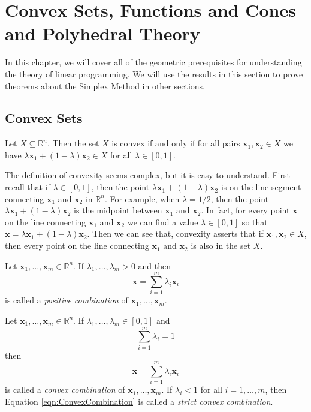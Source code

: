 \chapter{Convex Sets, Functions and Cones and Polyhedral Theory}
In this chapter, we will cover all of the geometric prerequisites for understanding the theory of linear programming. We will use the results in this section to prove theorems about the Simplex Method in other sections.

\section{Convex Sets}
\begin{definition} Let $X \subseteq \mathbb{R}^n$. Then the set $X$ is convex if and only if for all pairs $\mathbf{x}_1,\mathbf{x}_2 \in X$ we have $\lambda\mathbf{x}_1 + (1-\lambda)\mathbf{x}_2 \in X$ for all $\lambda \in [0,1]$.
\end{definition}

The definition of convexity seems complex, but it is easy to understand. First recall that if $\lambda \in [0,1]$, then the point $\lambda\mathbf{x}_1 + (1-\lambda)\mathbf{x}_2$ is on the line segment connecting $\mathbf{x}_1$ and $\mathbf{x}_2$ in $\mathbb{R}^n$. For example, when $\lambda = 1/2$, then the point $\lambda\mathbf{x}_1 + (1-\lambda)\mathbf{x}_2$ is the midpoint between $\mathbf{x}_1$ and $\mathbf{x}_2$. In fact, for every point $\mathbf{x}$ on the line connecting $\mathbf{x}_1$ and $\mathbf{x}_2$ we can find a value $\lambda \in [0,1]$ so that $\mathbf{x} = \lambda\mathbf{x}_1 + (1-\lambda)\mathbf{x}_2$. Then we can see that, convexity asserts that if $\mathbf{x}_1,\mathbf{x}_2 \in X$, then every point on the line connecting $\mathbf{x}_1$ and $\mathbf{x}_2$ is also in the set $X$. 

\begin{definition} Let $\mathbf{x}_1,\dots,\mathbf{x}_m \in \mathbb{R}^n$. If $\lambda_1,\dots,\lambda_m > 0$ and 
then 
\begin{equation}
\mathbf{x} = \sum_{i=1}^m\lambda_i\mathbf{x}_i
\end{equation}
is called a \textit{positive combination} of $\mathbf{x}_1,\dots,\mathbf{x}_m$.
\end{definition}

\begin{definition} Let $\mathbf{x}_1,\dots,\mathbf{x}_m \in \mathbb{R}^n$. If $\lambda_1,\dots,\lambda_m \in [0,1]$ and 
\begin{displaymath}
\sum_{i=1}^m\lambda_i = 1
\end{displaymath} 
then 
\begin{equation}
\mathbf{x} = \sum_{i=1}^m\lambda_i\mathbf{x}_i
\label{eqn:ConvexCombination}
\end{equation}
is called a \textit{convex combination} of $\mathbf{x}_1,\dots,\mathbf{x}_m$. If $\lambda_i < 1$ for all $i=1,\dots,m$, then Equation \ref{eqn:ConvexCombination} is called a \textit{strict convex combination}.
\end{definition}

